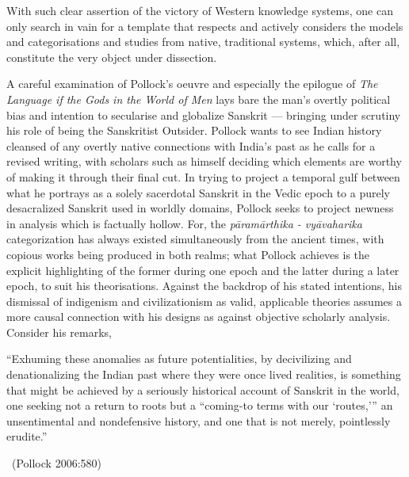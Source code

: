 With such clear assertion of the victory of Western knowledge systems, one can only search in vain for a template that respects and actively considers the models and categorisations and studies from native, traditional systems, which, after all, constitute the very object under dissection.

A careful examination of Pollock’s oeuvre and especially the epilogue of \textit{The Language if the Gods in the World of Men} lays bare the man’s overtly political bias and intention to secularise and globalize Sanskrit — bringing under scrutiny his role of being the Sanskritist Outsider. Pollock wants to see Indian history cleansed of any overtly native connections with India’s past as he calls for a revised writing, with scholars such as himself deciding which elements are worthy of making it through their final cut. In trying to project a temporal gulf between what he portrays as a solely sacerdotal Sanskrit in the Vedic epoch to a purely desacralized Sanskrit used in worldly domains, Pollock seeks to project newness in analysis which is factually hollow. For, the \textit{pāramārthika - vyāvaharika} categorization has always existed simultaneously from the ancient times, with copious works being produced in both realms; what Pollock achieves is the explicit highlighting of the former during one epoch and the latter during a later epoch, to suit his theorisations. Against the backdrop of his stated intentions, his dismissal of indigenism and civilizationism as valid, applicable theories assumes a more causal connection with his designs as against objective scholarly analysis. Consider his remarks,

\begin{myquote}
“Exhuming these anomalies as future potentialities, by decivilizing and denationalizing the Indian past where they were once lived realities, is something that might be achieved by a seriously historical account of Sanskrit in the world, one seeking not a return to roots but a “coming-to terms with our ‘routes,’” an unsentimental and nondefensive history, and one that is not merely, pointlessly erudite.” 

~\hfill (Pollock 2006:580)
\end{myquote}

